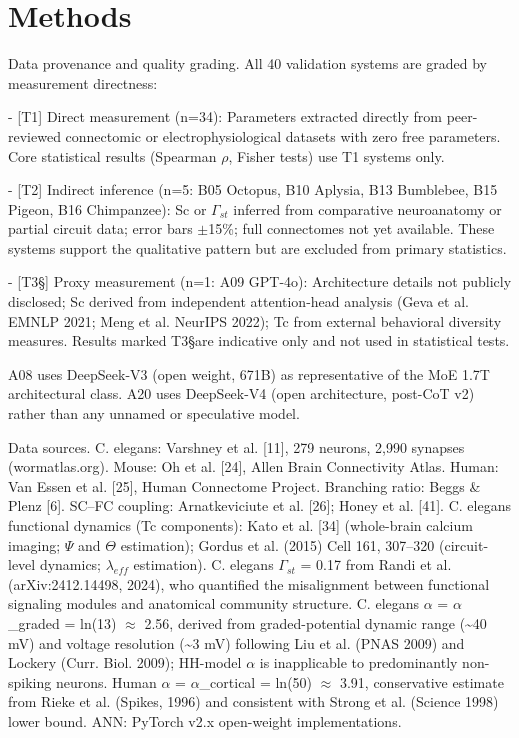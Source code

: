 \documentclass[a4paper,12pt]{article}
\begin{document}
\section{Methods}

Data provenance and quality grading. All 40 validation systems are graded by measurement directness:


- [T1] Direct measurement (n=34): Parameters extracted directly from peer-reviewed connectomic or electrophysiological datasets with zero free parameters. Core statistical results (Spearman $\rho$, Fisher tests) use T1 systems only.


- [T2\dag] Indirect inference (n=5: B05 Octopus, B10 Aplysia, B13 Bumblebee, B15 Pigeon, B16 Chimpanzee): Sc or $\Gamma_{st}$ inferred from comparative neuroanatomy or partial circuit data; error bars $\pm$15\%; full connectomes not yet available. These systems support the qualitative pattern but are excluded from primary statistics.


- [T3\S] Proxy measurement (n=1: A09 GPT-4o): Architecture details not publicly disclosed; Sc derived from independent attention-head analysis (Geva et al. EMNLP 2021; Meng et al. NeurIPS 2022); Tc from external behavioral diversity measures. Results marked T3\S are indicative only and not used in statistical tests.


A08 uses DeepSeek-V3 (open weight, 671B) as representative of the MoE 1.7T architectural class. A20 uses DeepSeek-V4 (open architecture, post-CoT v2) rather than any unnamed or speculative model.


Data sources.
C. elegans: Varshney et al. [11], 279 neurons, 2,990 synapses (wormatlas.org).
Mouse: Oh et al. [24], Allen Brain Connectivity Atlas.
Human: Van Essen et al. [25], Human Connectome Project.
Branching ratio: Beggs \& Plenz [6].
SC--FC coupling: Arnatkeviciute et al. [26]; Honey et al. [41].
C. elegans functional dynamics (Tc components): Kato et al. [34] (whole-brain calcium imaging; $\Psi$ and $\Theta$ estimation); Gordus et al. (2015) Cell 161, 307--320 (circuit-level dynamics; $\lambda_{eff}$ estimation).
C. elegans $\Gamma_{st}$ = 0.17 from Randi et al. (arXiv:2412.14498, 2024), who quantified the misalignment between functional signaling modules and anatomical community structure.
C. elegans $\alpha$ = $\alpha$_graded = ln(13) $\approx$ 2.56, derived from graded-potential dynamic range (\textasciitilde{}40 mV) and voltage resolution (\textasciitilde{}3 mV) following Liu et al. (PNAS 2009) and Lockery (Curr.
Biol. 2009); HH-model $\alpha$ is inapplicable to predominantly non-spiking neurons.
Human $\alpha$ = $\alpha$_cortical = ln(50) $\approx$ 3.91, conservative estimate from Rieke et al. (Spikes, 1996) and consistent with Strong et al. (Science 1998) lower bound.
ANN: PyTorch v2.x open-weight implementations.
\end{document}
